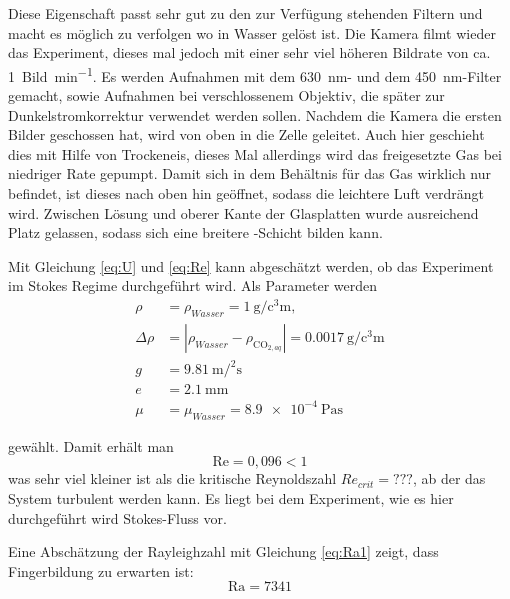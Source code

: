 
Diese Eigenschaft passt sehr gut zu den zur Verfügung stehenden Filtern und macht es möglich zu verfolgen wo \COT in Wasser gelöst ist.
Die Kamera filmt wieder das Experiment, dieses mal jedoch mit einer sehr viel höheren Bildrate von ca. \SI{1}{Bild\per\minute}.  Es werden Aufnahmen mit dem \SI{630}{\nano\meter}- und dem \SI{450}{\nano\meter}-Filter gemacht, sowie Aufnahmen bei verschlossenem Objektiv, die später zur Dunkelstromkorrektur verwendet 
werden sollen. 
Nachdem die Kamera die ersten Bilder geschossen hat, wird von oben \COT in die Zelle geleitet. Auch hier geschieht dies mit Hilfe von 
Trockeneis, dieses Mal allerdings wird das freigesetzte Gas bei niedriger Rate gepumpt. Damit sich in dem Behältnis für das Gas wirklich nur \COT befindet, ist dieses nach oben hin geöffnet, sodass die leichtere Luft verdrängt wird. Zwischen Lösung und oberer Kante der Glasplatten wurde ausreichend Platz gelassen, sodass sich eine breitere \COT-Schicht bilden kann.

Mit Gleichung \ref{eq:U} und \ref{eq:Re} kann abgeschätzt werden, ob das Experiment im Stokes Regime durchgeführt wird. Als Parameter werden 
\begin{align*}
  \rho &= \rho_{Wasser} = \SI{1}{\g\per\cubic\centi\meter}, \\ 
  \Delta\rho &= \left| \rho_{Wasser} - \rho_{\mathrm{CO}_{2, aq}} \right| = \SI[round-precision=4]{0,0017}{\gram\per\cubic\centi\meter} \\
  g &= \SI[round-precision=2]{9,81}{\meter\per\squared\second} \\
  e &= \SI[round-precision=1]{2,1}{\milli\meter} \\
  \mu &= \mu_{Wasser} = \SI{8,9e-4}{\pascal\second}
\end{align*}

gewählt. Damit erhält man
\begin{equation}
 \mathrm{Re} = 0,096 < 1
\end{equation}
was sehr viel kleiner ist als die kritische Reynoldszahl $Re_{crit} = ???$, ab der das System turbulent werden kann. Es liegt bei dem Experiment, wie es hier durchgeführt wird Stokes-Fluss vor.

Eine Abschätzung der Rayleighzahl mit Gleichung \ref{eq:Ra1} zeigt, dass Fingerbildung zu erwarten ist:
\begin{equation}
 \mathrm{Ra} = 7341
\end{equation}



